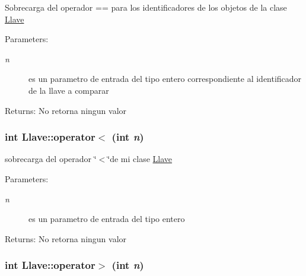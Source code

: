 Sobrecarga del operador == para los identificadores de los objetos de la clase \hyperlink{classLlave}{Llave} \begin{Desc}
\item[Parameters:]
\begin{description}
\item[{\em n}]es un parametro de entrada del tipo entero correspondiente al identificador de la llave a comparar \end{description}
\end{Desc}
\begin{Desc}
\item[Returns:]No retorna ningun valor \end{Desc}
\hypertarget{classLlave_a6d47e36c8bcd46f7153d00f7ca343d5}{
\subsubsection[operator$<$]{\setlength{\rightskip}{0pt plus 5cm}int Llave::operator$<$ (int {\em n})}}
\label{classLlave_a6d47e36c8bcd46f7153d00f7ca343d5}


sobrecarga del operador \char`\"{}$<$\char`\"{}de mi clase \hyperlink{classLlave}{Llave} \begin{Desc}
\item[Parameters:]
\begin{description}
\item[{\em n}]es un parametro de entrada del tipo entero \end{description}
\end{Desc}
\begin{Desc}
\item[Returns:]No retorna ningun valor \end{Desc}
\hypertarget{classLlave_c5abd96ecfa2d3e8827fce2710b1cbdd}{
\subsubsection[operator$>$]{\setlength{\rightskip}{0pt plus 5cm}int Llave::operator$>$ (int {\em n})}}
\label{classLlave_c5abd96ecfa2d3e8827fce2710b1cbdd}


